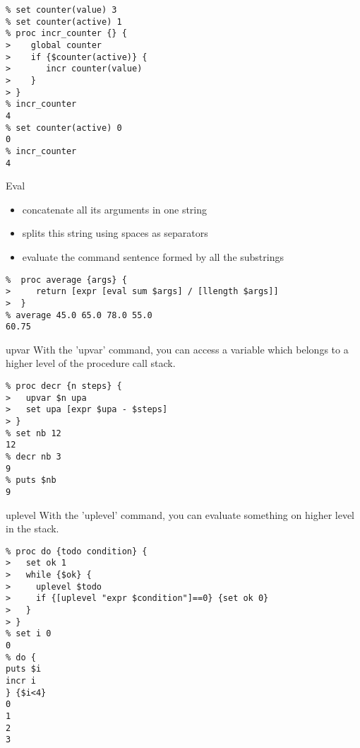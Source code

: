 
\begin{frame}[containsverbatim]{}
\lstset{language=tcl}
\begin{lstlisting}
% set counter(value) 3
% set counter(active) 1
% proc incr_counter {} {
>    global counter
>    if {$counter(active)} {
>       incr counter(value)
>    }
> }
% incr_counter
4
% set counter(active) 0
0
% incr_counter
4
\end{lstlisting}
\end{frame}




\begin{frame}[containsverbatim]{Eval}
\begin{itemize}
\item concatenate all its arguments in one string 
\item splits this string using spaces as separators 
\item evaluate the command sentence formed by all the substrings 
\end{itemize}
\lstset{language=tcl}
\begin{lstlisting}
%  proc average {args} {
>     return [expr [eval sum $args] / [llength $args]] 
>  } 
% average 45.0 65.0 78.0 55.0
60.75
\end{lstlisting}
\end{frame}

\begin{frame}[containsverbatim]{upvar}
With the 'upvar' command, you can access a variable which belongs to a higher level of the procedure call stack. 
\begin{lstlisting}
% proc decr {n steps} {
>   upvar $n upa
>   set upa [expr $upa - $steps]
> }
% set nb 12
12
% decr nb 3
9
% puts $nb
9
\end{lstlisting}
\end{frame}

\begin{frame}[containsverbatim]{uplevel}
With the 'uplevel' command, you can evaluate something on higher level in the stack. 
\begin{lstlisting}
% proc do {todo condition} {
>   set ok 1
>   while {$ok} {
>     uplevel $todo
>     if {[uplevel "expr $condition"]==0} {set ok 0}
>   }
> }
% set i 0
0
% do {
puts $i
incr i
} {$i<4}
0
1
2
3
\end{lstlisting}
\end{frame}


